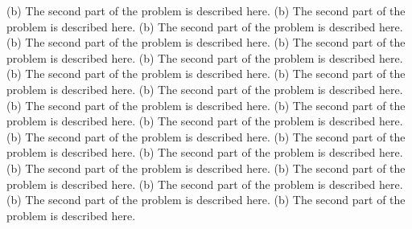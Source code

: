 \begin{multicols}{2}
(b) The second part of the problem is described here.
(b) The second part of the problem is described here.
(b) The second part of the problem is described here.
(b) The second part of the problem is described here.
(b) The second part of the problem is described here.
(b) The second part of the problem is described here.
(b) The second part of the problem is described here.
(b) The second part of the problem is described here.
(b) The second part of the problem is described here.
(b) The second part of the problem is described here.
(b) The second part of the problem is described here.
(b) The second part of the problem is described here.
(b) The second part of the problem is described here.
(b) The second part of the problem is described here.
(b) The second part of the problem is described here.
(b) The second part of the problem is described here.
(b) The second part of the problem is described here.
(b) The second part of the problem is described here.
(b) The second part of the problem is described here.
(b) The second part of the problem is described here.

\end{multicols}
%
